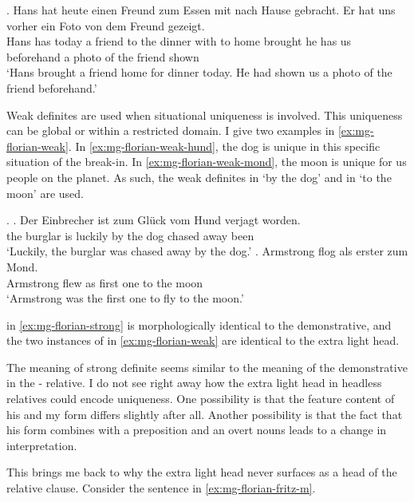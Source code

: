\exg. Hans hat heute einen Freund zum Essen mit nach Hause gebracht. Er hat uns vorher ein Foto von dem Freund gezeigt.\\
Hans has today a friend {to the} dinner with to home brought he has us beforehand a photo of the friend shown\\
`Hans brought a friend home for dinner today. He had shown us a photo of the friend beforehand.'\label{ex:mg-florian-strong}

Weak definites are used when situational uniqueness is involved. This uniqueness can be global or within a restricted domain. I give two examples in \ref{ex:mg-florian-weak}. In \ref{ex:mg-florian-weak-hund}, the dog is unique in this specific situation of the break-in. In \ref{ex:mg-florian-weak-mond}, the moon is unique for us people on the planet. As such, the weak definites  in  `by the dog' and in  `to the moon' are used.

\ex.\label{ex:mg-florian-weak}
\ag. Der Einbrecher ist {zum Glück} vom Hund verjagt worden.\\
the burglar is luckily {by the} dog {chased away} been\\
`Luckily, the burglar was chased away by the dog.'\label{ex:mg-florian-weak-hund}
\bg. Armstrong flog als erster zum Mond.\\
Armstrong flew as {first one} {to the} moon\\
`Armstrong was the first one to fly to the moon.' \label{ex:mg-florian-weak-mond}

 in \ref{ex:mg-florian-strong} is morphologically identical to the demonstrative, and the two instances of  in \ref{ex:mg-florian-weak} are identical to the extra light head.

The meaning of  strong definite seems similar to the meaning of the demonstrative in the - relative.
I do not see right away how the extra light head in headless relatives could encode uniqueness. One possibility is that the feature content of his and my form differs slightly after all. Another possibility is that the fact that his form combines with a preposition and an overt nouns leads to a change in interpretation.

This brings me back to why the extra light head never surfaces as a head of the relative clause. Consider the sentence in \ref{ex:mg-florian-fritz-m}.

